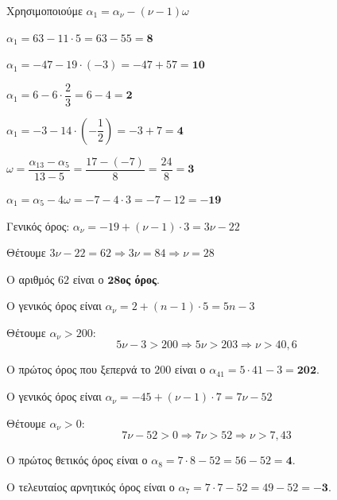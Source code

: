 \documentclass[11pt,a4paper,modern]{FFExercises}
\begin{document}
\lysh[12]
Χρησιμοποιούμε $\alpha_1=\alpha_{\nu}-(\nu-1)\omega$
\begin{alist}
\item $\alpha_1=63-11\cdot 5=63-55=\boldsymbol{8}$

\item $\alpha_1=-47-19\cdot(-3)=-47+57=\boldsymbol{10}$

\item $\alpha_1=6-6\cdot\dfrac{2}{3}=6-4=\boldsymbol{2}$

\item $\alpha_1=-3-14\cdot\left(-\dfrac{1}{2}\right)=-3+7=\boldsymbol{4}$
\end{alist}

\lysh[13]
\begin{alist}
\item $\omega=\dfrac{\alpha_{13}-\alpha_5}{13-5}=\dfrac{17-(-7)}{8}=\dfrac{24}{8}=\boldsymbol{3}$

\item $\alpha_1=\alpha_5-4\omega=-7-4\cdot 3=-7-12=\boldsymbol{-19}$

\item Γενικός όρος: $\alpha_{\nu}=-19+(\nu-1)\cdot 3=3\nu-22$

Θέτουμε $3\nu-22=62 \Rightarrow 3\nu=84 \Rightarrow \nu=28$

Ο αριθμός $62$ είναι ο $\boldsymbol{28}$\textbf{ος όρος}.
\end{alist}

\lysh[14]
Ο γενικός όρος είναι $\alpha_{\nu}=2+(n-1)\cdot 5=5n-3$

Θέτουμε $\alpha_{\nu}>200$:
$$5\nu-3>200 \Rightarrow 5\nu>203 \Rightarrow \nu>40{,}6$$

Ο πρώτος όρος που ξεπερνά το $200$ είναι ο $\alpha_{41}=5\cdot 41-3=\boldsymbol{202}$.

\lysh[15]
\begin{alist}
\item Ο γενικός όρος είναι $\alpha_{\nu}=-45+(\nu-1)\cdot 7=7\nu-52$

Θέτουμε $\alpha_{\nu}>0$:
$$7\nu-52>0 \Rightarrow 7\nu>52 \Rightarrow \nu>7{,}43$$

Ο πρώτος θετικός όρος είναι ο $\alpha_8=7\cdot 8-52=56-52=\boldsymbol{4}$.

\item Ο τελευταίος αρνητικός όρος είναι ο $\alpha_7=7\cdot 7-52=49-52=\boldsymbol{-3}$.
\end{alist}
\end{document}
